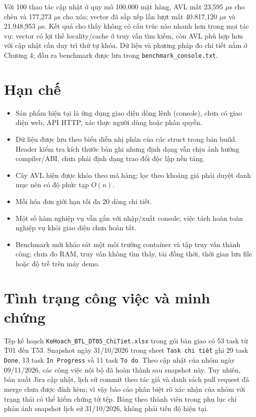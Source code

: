 Với 100 thao tác cập nhật ở quy mô 100.000 mặt hàng, AVL mất 23,595 $\mu$s cho chèn và 177,273 $\mu$s cho xóa; vector đã sắp xếp lần lượt mất 40.817,120 $\mu$s và 21.948,953 $\mu$s. Kết quả cho thấy không có cấu trúc nào nhanh hơn trong mọi tác vụ: vector có lợi thế locality/cache ở truy vấn tìm kiếm, còn AVL phù hợp hơn với cập nhật cần duy trì thứ tự khóa. Dữ liệu và phương pháp đo chi tiết nằm ở Chương 4; đầu ra benchmark được lưu trong \texttt{benchmark\_console.txt}.

\section*{Hạn chế}
\begin{itemize}
  \item Sản phẩm hiện tại là ứng dụng giao diện dòng lệnh (console), chưa có giao diện web, API HTTP, xác thực người dùng hoặc phân quyền.
  \item Dữ liệu được lưu theo biểu diễn nhị phân của các struct trong bản build. Header kiểm tra kích thước bản ghi nhưng định dạng vẫn chịu ảnh hưởng compiler/ABI, chưa phải định dạng trao đổi độc lập nền tảng.
  \item Cây AVL hiện được khóa theo mã hàng; lọc theo khoảng giá phải duyệt danh mục nên có độ phức tạp $O(n)$.
  \item Mỗi hóa đơn giới hạn tối đa 20 dòng chi tiết.
  \item Một số hàm nghiệp vụ vẫn gắn với nhập/xuất console; việc tách hoàn toàn nghiệp vụ khỏi giao diện chưa hoàn tất.
  \item Benchmark mới khảo sát một môi trường container và tập truy vấn thành công; chưa đo RAM, truy vấn không tìm thấy, tải đồng thời, thời gian lưu file hoặc độ trễ trên máy demo.
\end{itemize}

\section*{Tình trạng công việc và minh chứng}
Tệp kế hoạch \texttt{KeHoach\_BTL\_DT05\_ChiTiet.xlsx} trong gói bàn giao có 53 task từ T01 đến T53. Snapshot ngày 31/10/2026 trong sheet \texttt{Task chi tiết} ghi 29 task \texttt{Done}, 13 task \texttt{In Progress} và 11 task \texttt{To do}. Theo cập nhật của nhóm ngày 09/11/2026, các công việc nội bộ đã hoàn thành sau snapshot này. Tuy nhiên, bản xuất Jira cập nhật, lịch sử commit theo tác giả và danh sách pull request đã merge chưa được đính kèm; vì vậy báo cáo phân biệt rõ xác nhận của nhóm với trạng thái có thể kiểm chứng từ tệp. Bảng theo thành viên trong phụ lục chỉ phản ánh snapshot lịch sử 31/10/2026, không phải tiến độ hiện tại.


